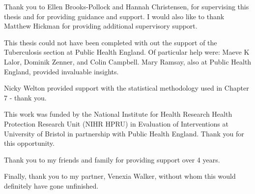 \documentclass[11pt,twoside]{bristolthesis}
\begin{document}
      \begin{acknowledgements}
      Thank you to Ellen Brooks-Pollock and Hannah Christensen, for supervising this thesis and for providing guidance and support. I would also like to thank Matthew Hickman for providing additional supervisory support.
      
      \par
      
      This thesis could not have been completed with out the support of the Tuberculosis section at Public Health England. Of particular help were: Maeve K Lalor, Dominik Zenner, and Colin Campbell. Mary Ramsay, also at Public Health England, provided invaluable insights.
      
      \par
      
      Nicky Welton provided support with the statistical methodology used in Chapter 7 - thank you.
      
      \par
      
      This work was funded by the National Institute for Health Research Health Protection Research Unit (NIHR HPRU) in Evaluation of Interventions at University of Bristol in partnership with Public Health England. Thank you for this opportunity.
      
      \par
      
      Thank you to my friends and family for providing support over 4 years.
      
      \par
      
      Finally, thank you to my partner, Venexia Walker, without whom this would definitely have gone unfinished.
    \end{acknowledgements}
\end{document}
